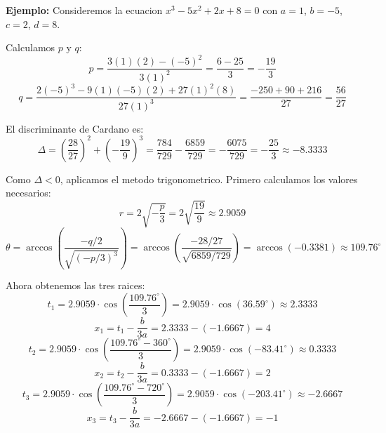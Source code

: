 \documentclass[letterpaper,12pt]{article}
\begin{document}
    \textbf{Ejemplo:} Consideremos la ecuacion $x^3 - 5x^2 + 2x + 8 = 0$ con $a=1$, $b=-5$, $c=2$, $d=8$.

    Calculamos $p$ y $q$:
    \begin{equation}
        p = \frac{3(1)(2) - (-5)^2}{3(1)^2} = \frac{6 - 25}{3} = -\frac{19}{3}
    \end{equation}
    \begin{equation}
        q = \frac{2(-5)^3 - 9(1)(-5)(2) + 27(1)^2(8)}{27(1)^3} = \frac{-250 + 90 + 216}{27} = \frac{56}{27}
    \end{equation}

    El discriminante de Cardano es:
    \begin{equation}
        \Delta = \left(\frac{28}{27}\right)^2 + \left(-\frac{19}{9}\right)^3 = \frac{784}{729} - \frac{6859}{729} = -\frac{6075}{729} = -\frac{25}{3} \approx -8.3333
    \end{equation}

    Como $\Delta < 0$, aplicamos el metodo trigonometrico. Primero calculamos los valores necesarios:
    \begin{equation}
        r = 2\sqrt{-\frac{p}{3}} = 2\sqrt{\frac{19}{9}} \approx 2.9059
    \end{equation}
    \begin{equation}
        \theta = \arccos\left(\frac{-q/2}{\sqrt{(-p/3)^3}}\right) = \arccos\left(\frac{-28/27}{\sqrt{6859/729}}\right) = \arccos(-0.3381) \approx 109.76^\circ
    \end{equation}

    Ahora obtenemos las tres raices:
    \begin{equation}
        t_1 = 2.9059 \cdot \cos\left(\frac{109.76^\circ}{3}\right) = 2.9059 \cdot \cos(36.59^\circ) \approx 2.3333
    \end{equation}
    \begin{equation}
        x_1 = t_1 - \frac{b}{3a} = 2.3333 - (-1.6667) = 4
    \end{equation}
    \begin{equation}
        t_2 = 2.9059 \cdot \cos\left(\frac{109.76^\circ - 360^\circ}{3}\right) = 2.9059 \cdot \cos(-83.41^\circ) \approx 0.3333
    \end{equation}
    \begin{equation}
        x_2 = t_2 - \frac{b}{3a} = 0.3333 - (-1.6667) = 2
    \end{equation}
    \begin{equation}
        t_3 = 2.9059 \cdot \cos\left(\frac{109.76^\circ - 720^\circ}{3}\right) = 2.9059 \cdot \cos(-203.41^\circ) \approx -2.6667
    \end{equation}
    \begin{equation}
        x_3 = t_3 - \frac{b}{3a} = -2.6667 - (-1.6667) = -1
    \end{equation}
\end{document}
